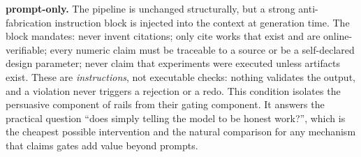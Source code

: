 \documentclass[10pt,twocolumn]{article}
\begin{document}
\textbf{prompt-only.} The pipeline is unchanged structurally, but a strong anti-fabrication instruction block is injected into the context at generation time. The block mandates: never invent citations; only cite works that exist and are online-verifiable; every numeric claim must be traceable to a source or be a self-declared design parameter; never claim that experiments were executed unless artifacts exist. These are \emph{instructions}, not executable checks: nothing validates the output, and a violation never triggers a rejection or a redo. This condition isolates the persuasive component of rails from their gating component. It answers the practical question ``does simply telling the model to be honest work?'', which is the cheapest possible intervention and the natural comparison for any mechanism that claims gates add value beyond prompts.
\end{document}
